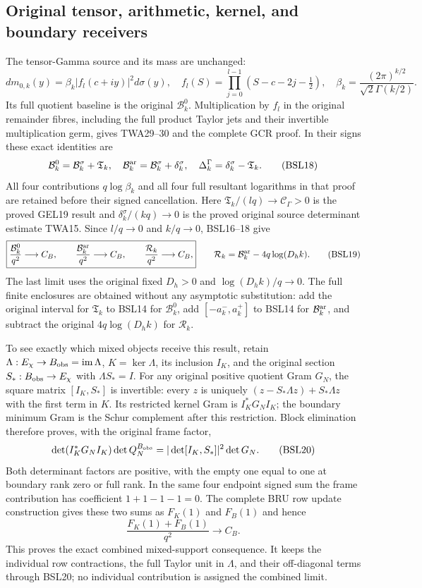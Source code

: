\documentclass[11pt,a4paper]{article}
\begin{document}
\subsection{Original tensor, arithmetic, kernel, and boundary receivers}
The tensor-Gamma source and its mass are unchanged:
\[
 dm_{0,k}(y)=\beta_k|f_l(c+iy)|^2d\sigma(y),\quad
 f_l(S)=\prod_{j=0}^{l-1}(S-c-2j-\tfrac12),\quad
 \beta_k=\frac{(2\pi)^{k/2}}{\sqrt2\Gamma(k/2)}.
 \tag{BSL17}
\]
Its full quotient baseline is the original $\mathcal B_k^0$.
Multiplication by $f_l$ in the original remainder fibres, including
the full product Taylor jets and their invertible multiplication germ,
gives TWA29--30 and the complete GCR proof. In their signs these exact
identities are
\[
 \mathcal B_k^0=\mathcal B_k^\sigma+\mathfrak T_k,
 \quad\mathcal B_k^{\rm ar}=\mathcal B_k^\sigma+\delta_k^\sigma,
 \quad\Delta_k^\Gamma=\delta_k^\sigma-\mathfrak T_k.
 \tag{BSL18}
\]
All four contributions $q\log\beta_k$ and all four full resultant
logarithms in that proof are retained before their signed cancellation.
Here $\mathfrak T_k/(lq)\to\mathcal C_\Gamma>0$ is the proved
GEL19 result and $\delta_k^\sigma/(kq)\to0$ is the proved original
source determinant estimate TWA15. Since $l/q\to0$ and $k/q\to0$,
BSL16--18 give
\[
 \boxed{\frac{\mathcal B_k^0}{q^2}\longrightarrow C_B,\qquad
 \frac{\mathcal B_k^{\rm ar}}{q^2}\longrightarrow C_B,\qquad
 \frac{\mathcal R_k}{q^2}\longrightarrow C_B,}
 \qquad\mathcal R_k=\mathcal B_k^{\rm ar}-4q\log(D_hk).
 \tag{BSL19}
\]
The last limit uses the original fixed $D_h>0$ and
$\log(D_hk)/q\to0$. The full finite enclosures are obtained without
any asymptotic substitution: add the original interval for
$\mathfrak T_k$ to BSL14 for $\mathcal B_k^0$, add
$[-a_k^-,a_k^+]$ to BSL14 for $\mathcal B_k^{\rm ar}$, and subtract
the original $4q\log(D_hk)$ for $\mathcal R_k$.

To see exactly which mixed objects receive this result, retain
$\Lambda:E_\chi\to B_{\rm obs}=\operatorname{im}\Lambda$,
$K=\ker\Lambda$, its inclusion $I_K$, and the original section
$S_*:B_{\rm obs}\to E_\chi$ with $\Lambda S_*=I$.
For any original positive quotient Gram $G_N$, the square matrix
$[I_K,S_*]$ is invertible: every $z$ is uniquely
$(z-S_*\Lambda z)+S_*\Lambda z$ with the first term in $K$.
Its restricted kernel Gram is $I_K^*G_NI_K$; the boundary minimum
Gram is the Schur complement after this restriction. Block elimination
therefore proves, with the original frame factor,
\[
 \det(I_K^*G_NI_K)\det Q_N^{B_{\rm obs}}
       =|\det[I_K,S_*]|^2\det G_N.
 \tag{BSL20}
\]
Both determinant factors are positive, with the empty one equal to one
at boundary rank zero or full rank. In the same four endpoint signed
sum the frame contribution has coefficient $1+1-1-1=0$.
The complete BRU row update construction gives these two sums as
$F_K(1)$ and $F_B(1)$ and hence
\[
 \frac{F_K(1)+F_B(1)}{q^2}\longrightarrow C_B.
 \tag{BSL21}
\]
This proves the exact combined mixed-support consequence. It keeps
the individual row contractions, the full Taylor unit in $\Lambda$,
and their off-diagonal terms through BSL20; no individual contribution
is assigned the combined limit.
\end{document}
